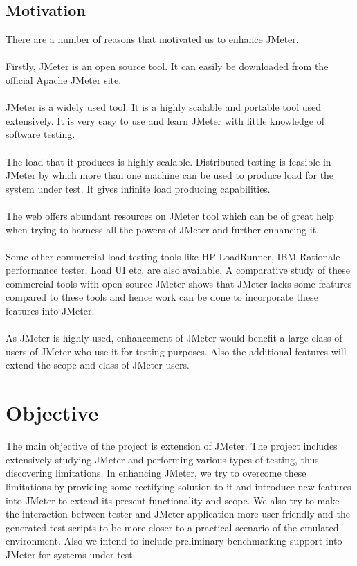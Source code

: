 \documentclass[12pt]{book}
\begin{document}
\section{Motivation}

There are a number of reasons that motivated us to enhance JMeter. \\
\\
Firstly, JMeter is an open source tool. It can easily be downloaded from the official Apache JMeter site.\\
\\
JMeter is a widely used tool. It is a highly scalable and portable tool used extensively. It is very easy to use 
and learn JMeter with little knowledge of software testing. \\
\\
The load that it produces is highly scalable. Distributed testing is feasible in JMeter by which more than one machine 
can be used to produce load for the system under test. It gives infinite load producing capabilities.\\
\\
The web offers abundant resources on JMeter tool which can be of great help when trying to harness all the powers of JMeter and further enhancing it.\\
\\
Some other commercial load testing tools like HP LoadRunner, IBM Rationale performance tester, Load UI etc, are also available.
A comparative study of these commercial tools with open source JMeter shows that JMeter lacks some features compared to these tools and hence work can be done to incorporate these features into JMeter.\\
\\
As JMeter is highly used, enhancement of JMeter would benefit a large class of users of JMeter who use it for testing purposes. 
Also the additional features will extend the scope and class of JMeter users.\\


\chapter{Objective}
The main objective of the project is extension of JMeter. The project includes extensively studying JMeter and performing various types of testing, 
thus discovering limitations. 
In enhancing JMeter, we try to overcome these limitations by providing some rectifying solution to it and introduce new features into JMeter to extend
its present functionality and scope. We also try to make the interaction between tester and JMeter application more user friendly and the generated test scripts
to be more closer to a practical scenario of the emulated environment. Also we intend to include preliminary benchmarking support into JMeter for systems under 
test.
\end{document}
